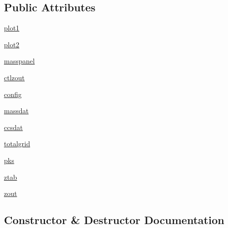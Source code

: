 \subsection*{Public Attributes}
\begin{DoxyCompactItemize}
\item 
\hyperlink{class_uni_dec_1_1unidec__modules_1_1_i_m__windows_1_1_i_m_tool_extract_a3b1e3b2253ae4dec9e79399a59778bb0}{plot1}
\item 
\hyperlink{class_uni_dec_1_1unidec__modules_1_1_i_m__windows_1_1_i_m_tool_extract_a191dd10f18c60277a94c2ae6d0759fb7}{plot2}
\item 
\hyperlink{class_uni_dec_1_1unidec__modules_1_1_i_m__windows_1_1_i_m_tool_extract_a6e7b373e3849164da3f6c9783f71c8b9}{masspanel}
\item 
\hyperlink{class_uni_dec_1_1unidec__modules_1_1_i_m__windows_1_1_i_m_tool_extract_a4bf28b97107d25f244912324d71b719e}{ctlzout}
\item 
\hyperlink{class_uni_dec_1_1unidec__modules_1_1_i_m__windows_1_1_i_m_tool_extract_a354d23522e36a48e12f4761f4a2788ba}{config}
\item 
\hyperlink{class_uni_dec_1_1unidec__modules_1_1_i_m__windows_1_1_i_m_tool_extract_a84790ca7eef109a664266791935c6bba}{massdat}
\item 
\hyperlink{class_uni_dec_1_1unidec__modules_1_1_i_m__windows_1_1_i_m_tool_extract_a588c4eb502155920278764d351201f62}{ccsdat}
\item 
\hyperlink{class_uni_dec_1_1unidec__modules_1_1_i_m__windows_1_1_i_m_tool_extract_ac8e980cdfbf6c00c327eb19af280d2fe}{totalgrid}
\item 
\hyperlink{class_uni_dec_1_1unidec__modules_1_1_i_m__windows_1_1_i_m_tool_extract_a9bb4ceab1c1da03bc6a1de52207d5000}{pks}
\item 
\hyperlink{class_uni_dec_1_1unidec__modules_1_1_i_m__windows_1_1_i_m_tool_extract_a46ce7ccc7118c7baf8441fc3d5b8f321}{ztab}
\item 
\hyperlink{class_uni_dec_1_1unidec__modules_1_1_i_m__windows_1_1_i_m_tool_extract_aba8fe3348d112738d60ef7e05cb42b70}{zout}
\end{DoxyCompactItemize}


\subsection{Constructor \& Destructor Documentation}
\hypertarget{class_uni_dec_1_1unidec__modules_1_1_i_m__windows_1_1_i_m_tool_extract_a1b829403c1450abd336ceabeaed59976}{}
